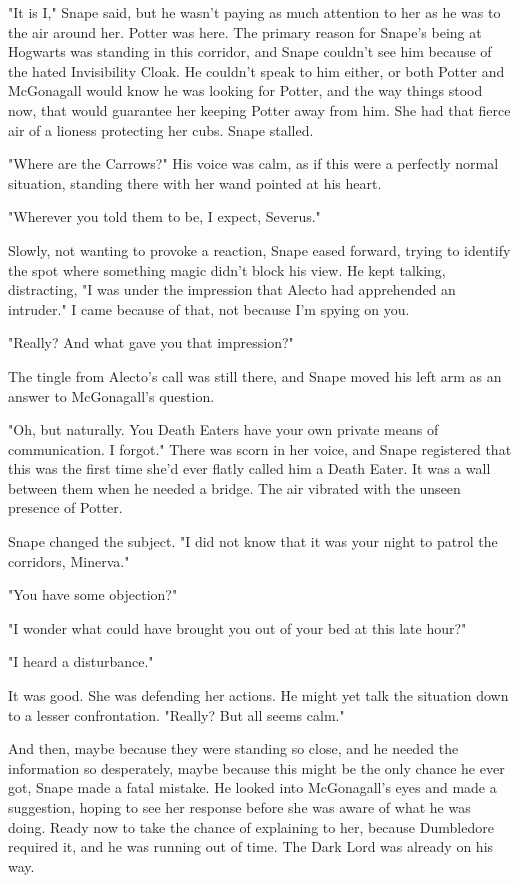 \documentclass[a4paper,11pt]{article}
\begin{document}
"It is I," Snape said, but he wasn't paying as much attention to her as he was to the air around her. Potter was here. The primary reason for Snape's being at Hogwarts was standing in this corridor, and Snape couldn't see him because of the hated Invisibility Cloak. He couldn't speak to him either, or both Potter and McGonagall would know he was looking for Potter, and the way things stood now, that would guarantee her keeping Potter away from him. She had that fierce air of a lioness protecting her cubs. Snape stalled.

"Where are the Carrows?" His voice was calm, as if this were a perfectly normal situation, standing there with her wand pointed at his heart.

"Wherever you told them to be, I expect, Severus."

Slowly, not wanting to provoke a reaction, Snape eased forward, trying to identify the spot where something magic didn't block his view. He kept talking, distracting, "I was under the impression that Alecto had apprehended an intruder." I came because of that, not because I'm spying on you.

"Really? And what gave you that impression?"

The tingle from Alecto's call was still there, and Snape moved his left arm as an answer to McGonagall's question.

"Oh, but naturally. You Death Eaters have your own private means of communication. I forgot." There was scorn in her voice, and Snape registered that this was the first time she'd ever flatly called him a Death Eater. It was a wall between them when he needed a bridge. The air vibrated with the unseen presence of Potter.

Snape changed the subject. "I did not know that it was your night to patrol the corridors, Minerva."

"You have some objection?"

"I wonder what could have brought you out of your bed at this late hour?"

"I heard a disturbance."

It was good. She was defending her actions. He might yet talk the situation down to a lesser confrontation. "Really? But all seems calm."

And then, maybe because they were standing so close, and he needed the information so desperately, maybe because this might be the only chance he ever got, Snape made a fatal mistake. He looked into McGonagall's eyes and made a suggestion, hoping to see her response before she was aware of what he was doing. Ready now to take the chance of explaining to her, because Dumbledore required it, and he was running out of time. The Dark Lord was already on his way.
\end{document}
